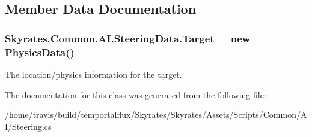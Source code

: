 \subsection{Member Data Documentation}
\hypertarget{class_skyrates_1_1_common_1_1_a_i_1_1_steering_data_af62ca00fa92111adb3380fdaa0ba6a0f}{
\subsubsection[{Target}]{ Skyrates.\-Common.\-A\-I.\-Steering\-Data.\-Target = new {\bf Physics\-Data}()}}\label{class_skyrates_1_1_common_1_1_a_i_1_1_steering_data_af62ca00fa92111adb3380fdaa0ba6a0f}


The location/physics information for the target. 



The documentation for this class was generated from the following file\-:\begin{DoxyCompactItemize}
\item 
/home/travis/build/temportalflux/\-Skyrates/\-Skyrates/\-Assets/\-Scripts/\-Common/\-A\-I/Steering.\-cs\end{DoxyCompactItemize}
